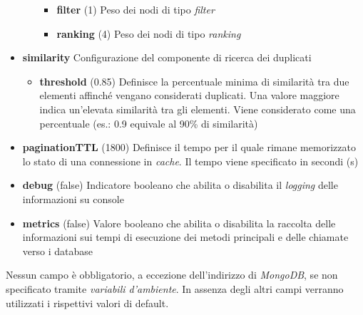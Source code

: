 \begin{itemize}
\begin{itemize}
\begin{itemize}
			\item \textbf{filter}
			(1) Peso dei nodi di tipo \emph{filter}
			\item \textbf{ranking}
			(4) Peso dei nodi di tipo \emph{ranking}
		\end{itemize}
	\end{itemize}
	\item \textbf{similarity}
	Configurazione del componente di ricerca dei duplicati
	\begin{itemize}
		\item \textbf{threshold}
		(0.85) Definisce la percentuale minima di similarità tra due elementi affinché vengano considerati duplicati. Una valore maggiore indica un'elevata similarità tra gli elementi. Viene considerato come una percentuale (es.: 0.9 equivale al 90\% di similarità)
	\end{itemize}
	\item \textbf{paginationTTL}
	(1800) Definisce il tempo per il quale rimane memorizzato lo stato di una connessione in \emph{cache}. Il tempo viene specificato in secondi (s)
	\item \textbf{debug}
	(false) Indicatore booleano che abilita o disabilita il \emph{logging} delle informazioni su console
	\item \textbf{metrics}
	(false) Valore booleano che abilita o disabilita la raccolta delle informazioni sui tempi di esecuzione dei metodi principali e delle chiamate verso i database
\end{itemize}

Nessun campo è obbligatorio, a eccezione dell'indirizzo di \emph{MongoDB}, se non specificato tramite \emph{variabili d'ambiente}. In assenza degli altri campi verranno utilizzati i rispettivi valori di default.